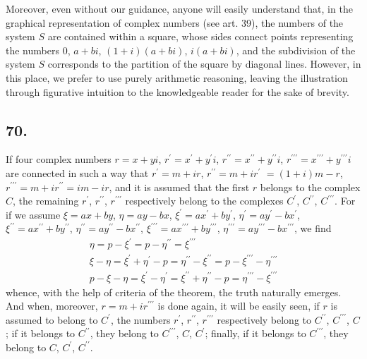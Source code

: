 \documentclass[twoside,12pt, showframe]{memoir}
\begin{document}
Moreover, even without our guidance, anyone will easily understand that, in the graphical representation of complex numbers (see art. 39), the numbers of the system \(S\) are contained within a square, whose sides connect points representing the numbers \(0\), \(a+b i\), \((1+i)(a+b i)\), \(i(a+b i)\), and the subdivision of the system \(S\) corresponds to the partition of the square by diagonal lines. However, in this place, we prefer to use purely arithmetic reasoning, leaving the illustration through figurative intuition to the knowledgeable reader for the sake of brevity.
%

\subsection*{70.}

If four complex numbers \(r=x+yi\), \(r^{\prime}=x^{\prime}+y^{\prime}i\), \(r^{\prime \prime}=x^{\prime \prime}+y^{\prime \prime}i\), \(r^{\prime \prime \prime}=x^{\prime \prime \prime}+y^{\prime \prime \prime}i\) are connected in such a way that \(r^{\prime}=m+ir\), \(r^{\prime \prime}=m+ir^{\prime}\) \(=(1+i)m-r\), \(r^{\prime \prime \prime}=m+ir^{\prime \prime}=im-ir\), and it is assumed that the first \(r\) belongs to the complex \(C\), the remaining \(r^{\prime}\), \(r^{\prime \prime}\), \(r^{\prime \prime \prime}\) respectively belong to the complexes \(C^{\prime}\), \(C^{\prime \prime}\), \(C^{\prime
\prime \prime}\). For if we assume \(\xi=ax+by\), \( \eta=ay-bx\), \(\xi^{\prime}=ax^{\prime}+by^{\prime}\), \( \eta^{\prime}=ay^{\prime}-bx^{\prime}\), \(\xi^{\prime \prime}=ax^{\prime \prime}+by^{\prime \prime}\), \( \eta^{\prime \prime}=ay^{\prime \prime}-bx^{\prime \prime}\), \(\xi^{\prime \prime \prime}=ax^{\prime \prime \prime}+by^{\prime \prime \prime}\), \( \eta^{\prime \prime \prime}=ay^{\prime \prime \prime}-bx^{\prime \prime \prime}\), we find
\[\begin{gathered}
\eta=p-\xi^{\prime}=p-\eta^{\prime \prime}=\xi^{\prime \prime \prime} \\
\xi-\eta=\xi^{\prime}+\eta^{\prime}-p=\eta^{\prime \prime}-\xi^{\prime \prime}=p-\xi^{\prime \prime \prime}-\eta^{\prime \prime \prime} \\
p-\xi-\eta=\xi^{\prime}-\eta^{\prime}=\xi^{\prime \prime}+\eta^{\prime \prime}-p=\eta^{\prime \prime \prime}-\xi^{\prime \prime \prime}
\end{gathered}\]
whence, with the help of criteria of the theorem, the truth naturally emerges. And when, moreover, \(r=m+ir^{\prime \prime \prime}\) is done again, it will be easily seen, if \(r\) is assumed to belong to \(C^{\prime}\), the numbers \(r^{\prime}\), \(r^{\prime \prime}\), \(r^{\prime \prime \prime}\) respectively belong to \(C^{\prime \prime}\), \(C^{\prime \prime \prime}\), \(C\); if it belongs to \(C^{\prime \prime}\), they belong to \(C^{\prime \prime \prime}\), \(C\), \(C^{\prime}\); finally, if it belongs to \(C^{\prime \prime \prime}\), they belong to \(C\), \(C^{\prime}\), \(C^{\prime \prime}\).
\end{document}

